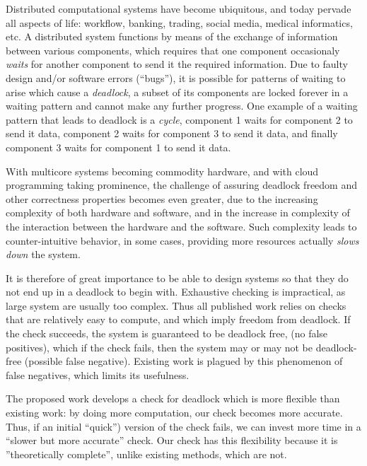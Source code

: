 Distributed computational systems have become ubiquitous, and today pervade all
aspects of life: workflow, banking, trading, social media, medical informatics,
etc.  A distributed system functions by means of the exchange of information
between various components, which requires that one component occasionaly
\emph{waits} for another component to send it the required information.  Due to
faulty design and/or software errors (``bugs''), it is possible for patterns of
waiting to arise which cause a {\em deadlock}, \ie a subset of its components
are locked forever in a waiting pattern and cannot make any further progress.
One example of a waiting pattern that leads to deadlock is a \emph{cycle}, \eg
component 1 waits for component 2 to send it data, component 2 waits for
component 3 to send it data, and finally component 3 waits for component 1 to
send it data.

With multicore systems becoming commodity hardware, and with cloud programming
taking prominence, the challenge of assuring deadlock freedom and other
correctness properties becomes even greater, due to the increasing complexity of
both hardware and software, and in the increase in complexity of the interaction
between the hardware and the software. Such complexity leads to
counter-intuitive behavior, \eg in some cases, providing more resources actually
\emph{slows down} the system.

It is therefore of great importance to be able to design systems so that they do
not end up in a deadlock to begin with.  Exhaustive checking is impractical, as
large system are usually too complex. Thus all published work relies on checks
that are relatively easy to compute, and which imply freedom from deadlock. If
the check succeeds, the system is guaranteed to be deadlock free, (no false
positives), which if the check fails, then the system may or may not be
deadlock-free (possible false negative).  Existing work is plagued by this
phenomenon of false negatives, which limits its usefulness.

The proposed work develops a check for deadlock which is more flexible than
existing work: by doing more computation, our check becomes more accurate. Thus,
if an initial ``quick'') version of the check fails, we can invest more time in
a ``slower but more accurate'' check.  Our check has this flexibility because it
is ''theoretically complete'', unlike existing methods, which are not.



%
